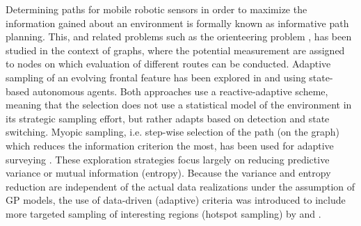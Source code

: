 \documentclass[aoas]{imsart}
\begin{document}
Determining paths for mobile robotic sensors in order to maximize the
information gained about an environment is formally known as informative
path planning. This, and related problems such as the orienteering
problem \citep{Golden87}, has been studied in the context of graphs,
where the potential measurement are assigned to nodes on which
evaluation of different routes can be conducted.
Adaptive sampling of an evolving frontal feature has been explored in \cite{Zhang2012} and \cite{Pinto2018} using state-based autonomous agents. Both approaches use a reactive-adaptive scheme, meaning that the selection does not use a statistical model of the environment in its strategic sampling effort, but rather adapts based on detection and state switching.
Myopic sampling, i.e. step-wise selection of the path (on the graph) which reduces the information criterion the most, has been used for adaptive surveying \citep{singh2009efficient,Binney2013}. These exploration strategies focus largely on reducing predictive variance or mutual information (entropy). Because the variance and entropy reduction are independent of the actual data realizations under the assumption of GP models, the use of data-driven (adaptive) criteria was introduced to include more targeted sampling of interesting regions (hotspot sampling) by \cite{Low2009} and \cite{fossuminformation}. 





\end{document}
